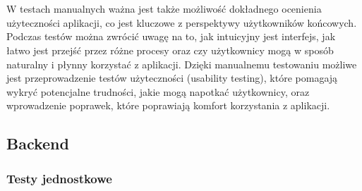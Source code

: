 \documentclass[12pt,a4paper]{article}
\begin{document}
\\\\
W testach manualnych ważna jest także możliwość dokładnego ocenienia użyteczności aplikacji, co jest kluczowe z perspektywy użytkowników końcowych. Podczas testów można zwrócić uwagę na to, jak intuicyjny jest interfejs, jak łatwo jest przejść przez różne procesy oraz czy użytkownicy mogą w sposób naturalny i płynny korzystać z aplikacji. Dzięki manualnemu testowaniu możliwe jest przeprowadzenie testów użyteczności (usability testing), które pomagają wykryć potencjalne trudności, jakie mogą napotkać użytkownicy, oraz wprowadzenie poprawek, które poprawiają komfort korzystania z aplikacji.

\newpage

\subsection{Backend}

\subsubsection{Testy jednostkowe}
\end{document}
